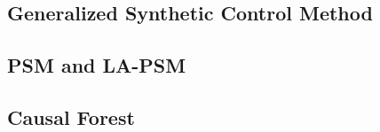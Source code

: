 \documentclass{article}
\begin{document}
\subsection{Generalized Synthetic Control Method}


\subsection{PSM and LA-PSM}


\subsection{Causal Forest}

\pagebreak


% 
\end{document}
